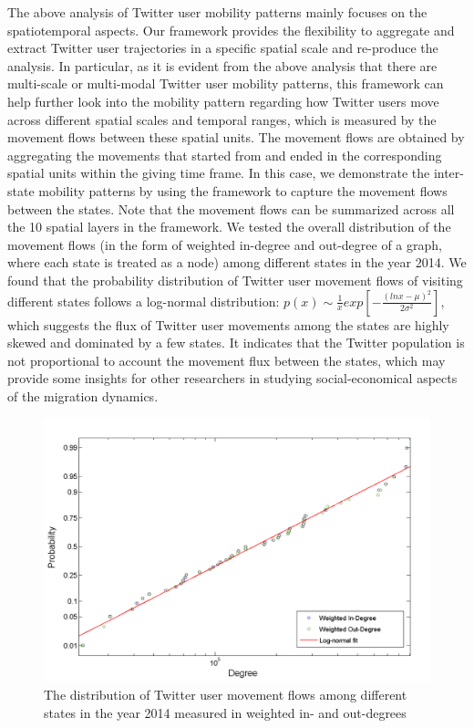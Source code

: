 \documentclass[ijgi,article,accept,moreauthors,pdftex,10pt,a4paper]{mdpi}
\theoremstyle{mdpi}
\newcounter{ex}
\newcounter{re}
\theoremstyle{mdpidefinition}
\begin{document}
The above analysis of Twitter user mobility patterns mainly focuses on the spatiotemporal aspects.
Our framework provides the flexibility to aggregate and extract Twitter user trajectories in a specific spatial scale and re-produce the analysis.
In particular, as it is evident from the above analysis that there are multi-scale or multi-modal Twitter user mobility patterns, this framework can help further look into the mobility pattern regarding how Twitter users move across different spatial scales and temporal ranges, which is measured by the movement flows between these spatial units.
The movement flows are obtained by aggregating the movements that started from and ended in the corresponding spatial units within the giving time frame.
In this case, we demonstrate the inter-state mobility patterns by using the framework to capture the movement flows between the states.
Note that the movement flows can be summarized across all the 10 spatial layers in the framework.
We tested the overall distribution of the movement flows (in the form of weighted in-degree and out-degree of a graph, where each state is treated as a node) among different states in the year 2014.
We found that the probability distribution of Twitter user movement flows of visiting different states follows a log-normal distribution: $p(x)\sim \frac{1}{x}exp[-\frac{(lnx - \mu)^{2}}{2\sigma^{2}}]$, which suggests the flux of Twitter user movements among the states are highly skewed and dominated by a few states.
It indicates that the Twitter population is not proportional to account the movement flux between the states, which may provide some insights for other researchers in studying social-economical aspects of the migration dynamics.

\begin{figure}[ht]
\centering
\includegraphics[width=0.8\linewidth]{./figures/degree}
\caption{The distribution of Twitter user movement flows among different states in the year 2014 measured in weighted in- and out-degrees}
\label{fig:state_flow}
\end{figure}
\FloatBarrier
\end{document}
